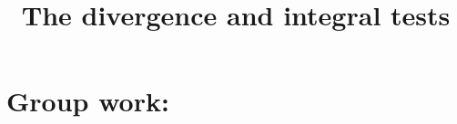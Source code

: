 \documentclass[]{ximera}
\title{The divergence and integral tests}
\begin{document}
\begin{abstract}		\end{abstract}
\maketitle



\begin{comment}
\section{Warm up:}

	\begin{freeResponse}
	
	\end{freeResponse}
	
\begin{instructorNotes}

\end{instructorNotes}
\end{comment}







\section{Group work:}
\end{document}
